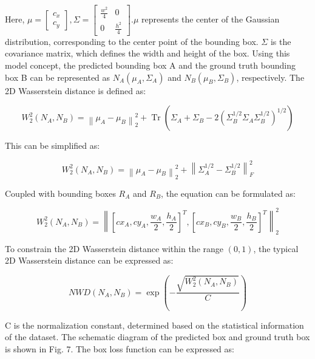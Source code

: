 \documentclass{article}
\begin{document}
Here, $\mu=\left[\begin{array}{l}c_{x} \\ c_{y}\end{array}\right], \Sigma=\left[\begin{array}{cc}\frac{w^{2}}{4} & 0 \\ 0 & \frac{h^{2}}{4}\end{array}\right] . \mu$ represents the center of the Gaussian distribution, corresponding to the center point of the bounding box. $\Sigma$ is the covariance matrix, which defines the width and height of the box. Using this model concept, the predicted bounding box A and the ground truth bounding box B can be represented as $N_{A}\left(\mu_{A}, \Sigma_{A}\right)$ and $N_{B}\left(\mu_{B}, \Sigma_{B}\right)$, respectively. The 2D Wasserstein distance is defined as:


\begin{equation*}
W_{2}^{2}\left(N_{A}, N_{B}\right)=\left\|\mu_{A}-\mu_{B}\right\|_{2}^{2}+\operatorname{Tr}\left(\Sigma_{A}+\Sigma_{B}-2\left(\Sigma_{B}^{1 / 2} \Sigma_{A} \Sigma_{B}^{1 / 2}\right)^{1 / 2}\right) \tag{11}
\end{equation*}


This can be simplified as:


\begin{equation*}
W_{2}^{2}\left(N_{A}, N_{B}\right)=\left\|\mu_{A}-\mu_{B}\right\|_{2}^{2}+\left\|\Sigma_{A}^{1 / 2}-\Sigma_{B}^{1 / 2}\right\|_{F}^{2} \tag{12}
\end{equation*}


Coupled with bounding boxes $R_{A}$ and $R_{B}$, the equation can be formulated as:


\begin{equation*}
W_{2}^{2}\left(N_{A}, N_{B}\right)=\left\|\left[c x_{A}, c y_{A}, \frac{w_{A}}{2}, \frac{h_{A}}{2}\right]^{T},\left[c x_{B}, c y_{B}, \frac{w_{B}}{2}, \frac{h_{B}}{2}\right]^{T}\right\|_{2}^{2} \tag{13}
\end{equation*}


To constrain the 2D Wasserstein distance within the range $(0,1)$, the typical 2D Wasserstein distance can be expressed as:


\begin{equation*}
N W D\left(N_{A}, N_{B}\right)=\exp \left(-\frac{\sqrt{W_{2}^{2}\left(N_{A}, N_{B}\right)}}{C}\right) \tag{14}
\end{equation*}


C is the normalization constant, determined based on the statistical information of the dataset. The schematic diagram of the predicted box and ground truth box is shown in Fig. 7. The box loss function can be expressed as:
\end{document}
